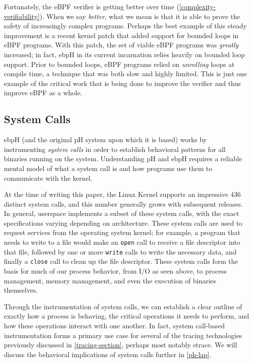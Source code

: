 \documentclass[
  12pt]{findlay}
\newcommand{\passthrough}[1]{#1}
\begin{document}
Fortunately, the eBPF verifier is getting better over time
(\autoref{complexity-verifiability}). When we say \emph{better}, what we
mean is that it is able to prove the safety of increasingly complex
programs. Perhaps the best example of this steady improvement is a
recent kernel patch \autocite{starovoitov19} that added support for
bounded loops in eBPF programs. With this patch, the set of viable eBPF
programs was \emph{greatly} increased; in fact, ebpH in its current
incarnation relies heavily on bounded loop support. Prior to bounded
loops, eBPF programs relied on \emph{unrolling} loops at compile time, a
technique that was both slow and highly limited. This is just one
example of the critical work that is being done to improve the verifier
and thus improve eBPF as a whole.

\hypertarget{system-calls}{%
\subsection{System Calls}\label{system-calls}}

ebpH (and the original pH system upon which it is based) works by
instrumenting \emph{system calls} in order to establish behavioral
patterns for all binaries running on the system. Understanding pH and
ebpH requires a reliable mental model of what a system call is and how
programs use them to communicate with the kernel.

At the time of writing this paper, the Linux Kernel \autocite{unistd}
supports an impressive 436 distinct system calls, and this number
generally grows with subsequent releases. In general, userspace
implements a subset of these system calls, with the exact specifications
varying depending on architecture. These system calls are used to
request services from the operating system kernel; for example, a
program that needs to write to a file would make an
\passthrough{\lstinline!open!} call to receive a file descriptor into
that file, followed by one or more \passthrough{\lstinline!write!} calls
to write the necessary data, and finally a
\passthrough{\lstinline!close!} call to clean up the file descriptor.
These system calls form the basis for much of our process behavior, from
I/O as seen above, to process management, memory management, and even
the execution of binaries themselves.

Through the instrumentation of system calls, we can establish a clear
outline of exactly how a process is behaving, the critical operations it
needs to perform, and how these operations interact with one another. In
fact, system call-based instrumentation forms a primary use case for
several of the tracing technologies previously discussed in
\autoref{tracing-section}, perhaps most notably strace. We will discuss
the behavioral implications of system calls further in \autoref{ph-lap}.
\end{document}
